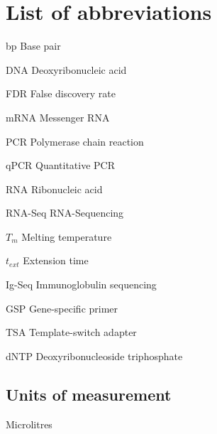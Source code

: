 \chapter{List of abbreviations}
\begin{abbreviations}
\item[bp] Base pair
\item[DNA] Deoxyribonucleic acid
\item[FDR] False discovery rate
\item[mRNA] Messenger RNA
\item[PCR] Polymerase chain reaction
\item[qPCR] Quantitative PCR
\item[RNA] Ribonucleic acid
\item[RNA-Seq] RNA-Sequencing
\item[$T_m$] Melting temperature
\item[$t_{ext}$] Extension time
\item[Ig-Seq] Immunoglobulin sequencing
\item[GSP] Gene-specific primer
\item[TSA] Template-switch adapter
\item[dNTP] Deoxyribonucleoside triphosphate
\end{abbreviations}

\section*{Units of measurement}

\begin{abbreviations}
\item[\ul{}] Microlitres
\end{abbreviations}


